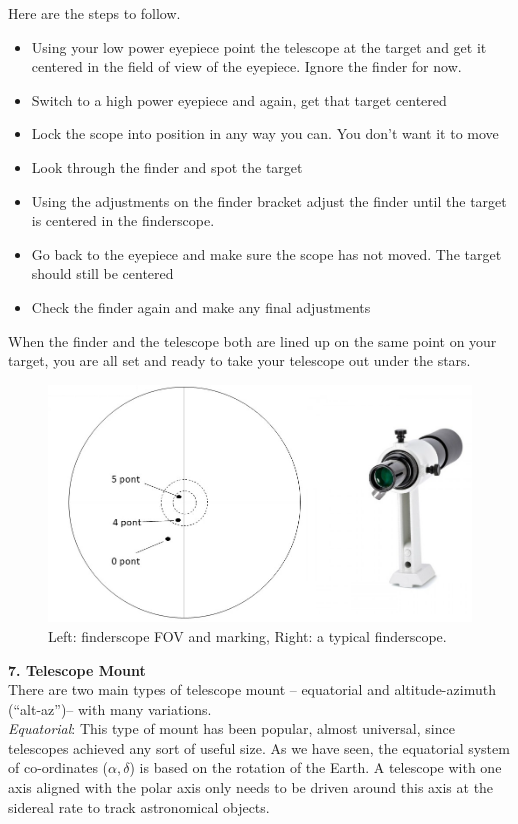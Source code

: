 \documentclass[a4paper,12pt]{extarticle}
\begin{document}
Here are the steps to follow.

\begin{itemize}
	\itemsep0em 
	\item Using your low power eyepiece point the telescope at the target and get it centered in the field of view of the eyepiece. Ignore the finder for now.
	\item Switch to a high power eyepiece and again, get that target centered
	\item Lock the scope into position in any way you can. You don’t want it to move
	\item Look through the finder and spot the target
	\item Using the adjustments on the finder bracket adjust the finder until the target is centered in the finderscope.
	\item Go back to the eyepiece and make sure the scope has not moved. The target should still be centered
	\item Check the finder again and make any final adjustments
\end{itemize}

When the finder and the telescope both are lined up on the same point on your target, you are all set and ready to take your telescope out under the stars.

\begin{figure}[H]
	\centering
	\includegraphics[width=0.8\linewidth]{finderscope.png}
	\caption{Left: finderscope FOV and marking, Right: a typical finderscope.}
\end{figure}
\textbf{7. Telescope Mount}\\

There are two main types of telescope mount – equatorial and altitude-azimuth (``alt-az'')– with many variations.\\

\textit{Equatorial}: This type of mount has been popular, almost universal, since telescopes achieved any sort of useful size. As we have seen, the equatorial system of co-ordinates ($\alpha, \delta$) is based on the rotation of the Earth. A telescope with one axis aligned with the polar axis only needs to be driven around this axis at the sidereal rate to track astronomical objects.\\
\end{document}
